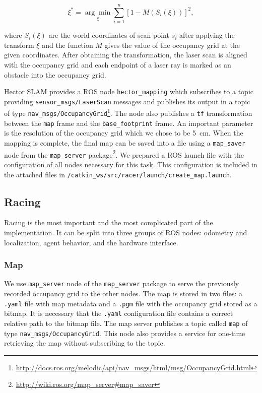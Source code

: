 $$
\xi^* = \underset{\xi}{\arg\min} \sum_{i=1}^n\left[ 1 - M\left( S_i\left( \xi\right)\right)\right]^2,
$$

where $S_i\left(\xi\right)$ are the world coordinates of scan point $s_i$ after applying the transform $\xi$ and the function $M$ gives the value of the occupancy grid at the given coordinates. After obtaining the transformation, the laser scan is aligned with the occupancy grid and each endpoint of a laser ray is marked as an obstacle into the occupancy grid.

Hector SLAM provides a \gls*{ROS} node \verb|hector_mapping| which subscribes to a topic providing \verb|sensor_msgs/LaserScan| messages and publishes its output in a topic of type \verb|nav_msgs/OccupancyGrid|\footnote{\url{http://docs.ros.org/melodic/api/nav\_msgs/html/msg/OccupancyGrid.html}}. The node also publishes a \verb|tf| transformation between the \verb|map| frame and the \verb|base_footprint| frame. An important parameter is the resolution of the occupancy grid which we chose to be \SI{5}{\centi\meter}. When the mapping is complete, the final map can be saved into a file using a \verb|map_saver| node from the \verb|map_server| package\footnote{\url{http://wiki.ros.org/map\_server\#map\_saver}}. We prepared a \gls*{ROS} launch file with the configuration of all nodes necessary for this task. This configuration is included in the attached files in \texttt{/catkin\_ws/\allowbreak  src/\allowbreak  racer/\allowbreak  launch/create\_map.launch}.

\subsection{Racing}

Racing is the most important and the most complicated part of the implementation. It can be split into three groups of \gls*{ROS} nodes: odometry and localization, agent behavior, and the hardware interface.

\subsubsection{Map}

We use \verb|map_server| node of the \verb|map_server| package to serve the previously recorded occupancy grid to the other nodes. The map is stored in two files: a \verb|.yaml| file with map metadata and a \verb|.pgm| file with the occupancy grid stored as a bitmap. It is necessary that the \verb|.yaml| configuration file contains a correct relative path to the bitmap file. The map server publishes a topic called \verb|map| of type \verb|nav_msgs/OccupancyGrid|. This node also provides a service for one-time retrieving the map without subscribing to the topic.

